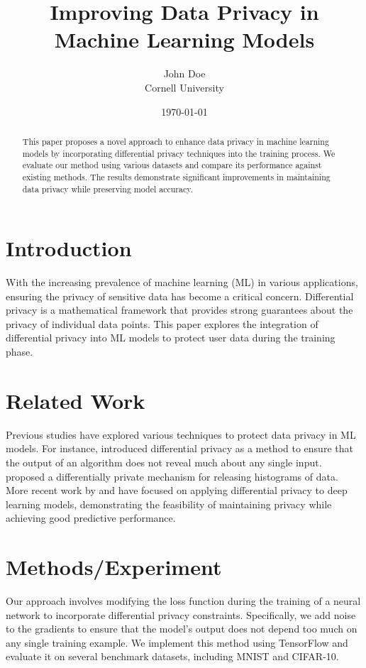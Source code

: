 \documentclass{article}
\title{Improving Data Privacy in Machine Learning Models}
\author{John Doe \\ Cornell University}
\date{\today}
\begin{document}
\maketitle

\begin{abstract}
This paper proposes a novel approach to enhance data privacy in machine learning models by incorporating differential privacy techniques into the training process. We evaluate our method using various datasets and compare its performance against existing methods. The results demonstrate significant improvements in maintaining data privacy while preserving model accuracy.
\end{abstract}

\section{Introduction}
With the increasing prevalence of machine learning (ML) in various applications, ensuring the privacy of sensitive data has become a critical concern. Differential privacy is a mathematical framework that provides strong guarantees about the privacy of individual data points. This paper explores the integration of differential privacy into ML models to protect user data during the training phase.

\section{Related Work}
Previous studies have explored various techniques to protect data privacy in ML models. For instance, \cite{Dwork2006} introduced differential privacy as a method to ensure that the output of an algorithm does not reveal much about any single input. \cite{McSherry2009} proposed a differentially private mechanism for releasing histograms of data. More recent work by \cite{Abadi2016} and \cite{Ghosh2019} have focused on applying differential privacy to deep learning models, demonstrating the feasibility of maintaining privacy while achieving good predictive performance.

\section{Methods/Experiment}
Our approach involves modifying the loss function during the training of a neural network to incorporate differential privacy constraints. Specifically, we add noise to the gradients to ensure that the model's output does not depend too much on any single training example. We implement this method using TensorFlow and evaluate it on several benchmark datasets, including MNIST and CIFAR-10.
\end{document}
